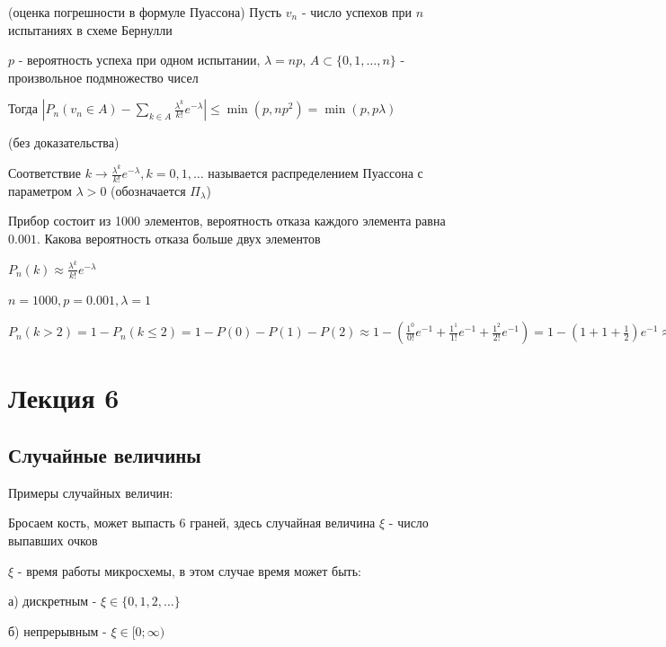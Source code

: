 \documentclass[12pt]{article}
\begin{document}
    \begin{MyTheorem}
         (оценка погрешности в формуле Пуассона) Пусть $v_n$ - число успехов при $n$ испытаниях в схеме Бернулли

        $p$ - вероятность успеха при одном испытании, $\lambda = np$, $A \subset \{0, 1, \dots, n\}$ - произвольное подмножество чисел

        Тогда $|P_n (v_n \in A) - \sum_{k \in A} \frac{\lambda^k}{k!} e^{-\lambda}| \leq \min (p, np^2) = \min (p, p\lambda)$

        (без доказательства)
    \end{MyTheorem}

    \Def Соответствие $k \to \frac{\lambda^k}{k!} e^{-\lambda}, k = 0, 1, \dots$ называется распределением Пуассона
    с параметром $\lambda > 0$ (обозначается $\Pi_\lambda$)

    \Ex Прибор состоит из 1000 элементов, вероятность отказа каждого элемента равна $0.001$. Какова вероятность отказа больше двух элементов

    $P_n(k) \approx \frac{\lambda^k}{k!} e^{-\lambda}$

    $n = 1000, p = 0.001, \lambda = 1$

    $P_n(k > 2) = 1 - P_n (k \leq 2) = 1 - P(0) - P(1) - P(2) \approx 1 - \left(\frac{1^0}{0!} e^{-1} + \frac{1^1}{1!} e^{-1} + \frac{1^2}{2!} e^{-1}\right) =
    1 - \left(1 + 1 + \frac{1}{2}\right) e^{-1} \approx 0.0803$


    \section{Лекция 6}

    \subsection{Случайные величины}

    Примеры случайных величин:

     Бросаем кость, может выпасть 6 граней, здесь случайная величина $\xi$ - число выпавших очков

     $\xi$ - время работы микросхемы, в этом случае время может быть:

    а) дискретным - $\xi \in \{0, 1, 2, \dots\}$

    б) непрерывным - $\xi \in [0; \infty)$
\end{document}
